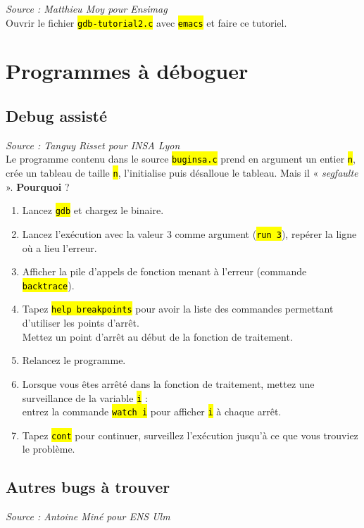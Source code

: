 \documentclass[final, pdftex, a4paper, openbib, ]{article}
\let\OldTexttt\texttt
\renewcommand{\texttt}[1]{\OldTexttt{\hl{#1}}}
\begin{document}
\textit{Source : Matthieu Moy pour Ensimag}\\
Ouvrir le fichier \texttt{gdb-tutorial2.c} avec \texttt{emacs} et faire ce tutoriel.


\section{Programmes à déboguer}

\subsection{Debug assisté}

\textit{Source : Tanguy Risset pour INSA Lyon}\\
Le programme contenu dans le source \texttt{buginsa.c} prend en argument un entier \texttt{n}, crée un tableau de taille \texttt{n}, l'initialise puis désalloue le tableau. Mais il « \textit{segfaulte} ». \textbf{Pourquoi} ?

\begin{enumerate}
	\item Lancez \texttt{gdb} et chargez le binaire.
	\item Lancez l'exécution avec la valeur 3 comme argument (\texttt{run 3}), repérer la ligne où a lieu l'erreur.
	\item Afficher la pile d'appels de fonction menant à l'erreur (commande \texttt{backtrace}).
	\item Tapez \texttt{help breakpoints} pour avoir la liste des commandes permettant d'utiliser les points d'arrêt.\\
	Mettez un point d'arrêt au début de la fonction de traitement.
	\item Relancez le programme.
	\item Lorsque vous êtes arrêté dans la fonction de traitement, mettez une surveillance de la variable \texttt{i} : \\
	entrez la commande \texttt{watch i} pour afficher \texttt{i} à chaque arrêt.
	\item Tapez \texttt{cont} pour continuer, surveillez l'exécution jusqu'à ce que vous trouviez le problème.
\end{enumerate}


\subsection{Autres bugs à trouver}

\textit{Source : Antoine Miné pour ENS Ulm}
\end{document}
